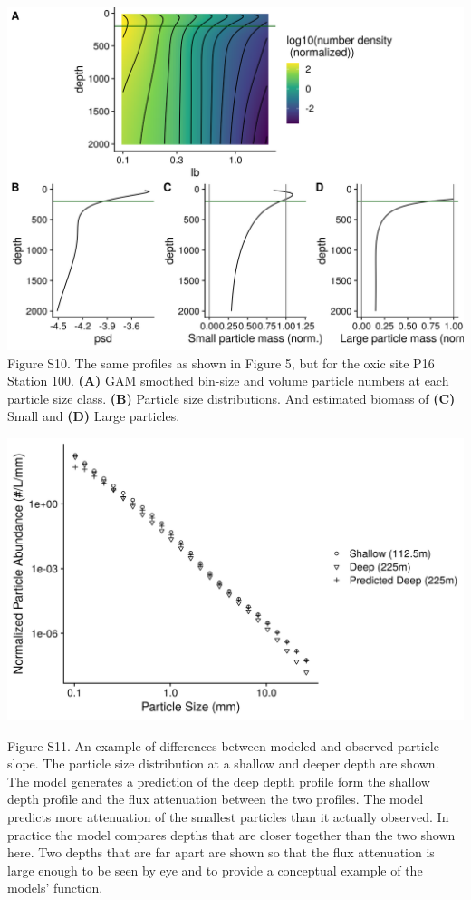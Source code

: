 \documentclass[]{article}
\begin{document}
\includegraphics{../figures/WBModelValidation_Oxic.png} Figure S10. The
same profiles as shown in Figure 5, but for the oxic site P16 Station
100. \textbf{(A)} GAM smoothed bin-size and volume particle numbers at
each particle size class. \textbf{(B)} Particle size distributions. And
estimated biomass of \textbf{(C)} Small and \textbf{(D)} Large
particles.

\includegraphics{../figures/DisagExample.png}

Figure S11. An example of differences between modeled and observed
particle slope. The particle size distribution at a shallow and deeper
depth are shown. The model generates a prediction of the deep depth
profile form the shallow depth profile and the flux attenuation between
the two profiles. The model predicts more attenuation of the smallest
particles than it actually observed. In practice the model compares
depths that are closer together than the two shown here. Two depths that
are far apart are shown so that the flux attenuation is large enough to
be seen by eye and to provide a conceptual example of the models'
function.
\end{document}
